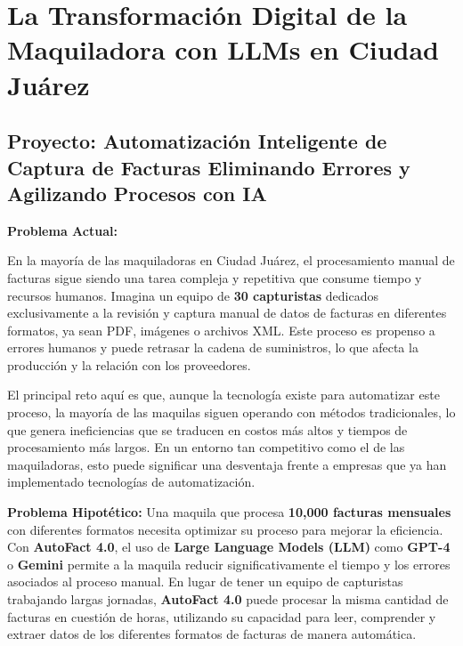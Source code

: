 \documentclass[
  10pt,
  letterpaper,
]{book}
\begin{document}
\section{La Transformación Digital de la Maquiladora con LLMs en Ciudad
Juárez}\label{la-transformaciuxf3n-digital-de-la-maquiladora-con-llms-en-ciudad-juuxe1rez}

\subsection{\texorpdfstring{Proyecto: \textbf{Automatización Inteligente
de Captura de Facturas} Eliminando Errores y Agilizando Procesos con
IA}{Proyecto: Automatización Inteligente de Captura de Facturas Eliminando Errores y Agilizando Procesos con IA}}\label{proyecto-automatizaciuxf3n-inteligente-de-captura-de-facturas-eliminando-errores-y-agilizando-procesos-con-ia}

\textbf{Problema Actual:}

En la mayoría de las maquiladoras en Ciudad Juárez, el procesamiento
manual de facturas sigue siendo una tarea compleja y repetitiva que
consume tiempo y recursos humanos. Imagina un equipo de \textbf{30
capturistas} dedicados exclusivamente a la revisión y captura manual de
datos de facturas en diferentes formatos, ya sean PDF, imágenes o
archivos XML. Este proceso es propenso a errores humanos y puede
retrasar la cadena de suministros, lo que afecta la producción y la
relación con los proveedores.

El principal reto aquí es que, aunque la tecnología existe para
automatizar este proceso, la mayoría de las maquilas siguen operando con
métodos tradicionales, lo que genera ineficiencias que se traducen en
costos más altos y tiempos de procesamiento más largos. En un entorno
tan competitivo como el de las maquiladoras, esto puede significar una
desventaja frente a empresas que ya han implementado tecnologías de
automatización.

\textbf{Problema Hipotético:} Una maquila que procesa \textbf{10,000
facturas mensuales} con diferentes formatos necesita optimizar su
proceso para mejorar la eficiencia. Con \textbf{AutoFact 4.0}, el uso de
\textbf{Large Language Models (LLM)} como \textbf{GPT-4} o
\textbf{Gemini} permite a la maquila reducir significativamente el
tiempo y los errores asociados al proceso manual. En lugar de tener un
equipo de capturistas trabajando largas jornadas, \textbf{AutoFact 4.0}
puede procesar la misma cantidad de facturas en cuestión de horas,
utilizando su capacidad para leer, comprender y extraer datos de los
diferentes formatos de facturas de manera automática.
\end{document}
